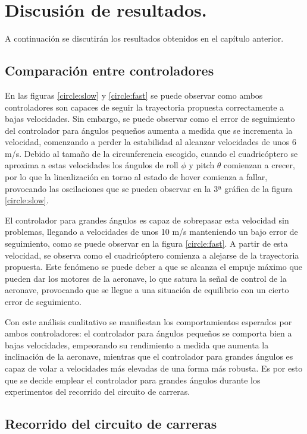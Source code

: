 \chapter{Discusión de resultados.}

A continuación se discutirán los resultados obtenidos en el capítulo anterior.

\section{Comparación entre controladores}

En las figuras \ref{circle:slow} y \ref{circle:fast} se puede observar como ambos controladores son capaces de seguir la trayectoria propuesta correctamente a bajas velocidades. Sin embargo, se puede observar como el error de seguimiento del controlador para ángulos pequeños aumenta a medida que se incrementa la velocidad, comenzando a perder la estabilidad al alcanzar velocidades de unos 6 m/s. Debido al tamaño de la circunferencia escogido, cuando el cuadricóptero se aproxima a estas velocidades los ángulos de roll $\phi $ y pitch $\theta$ comienzan a crecer, por lo que la linealización en torno al estado de hover comienza a fallar, provocando las oscilaciones que se pueden observar en la 3ª gráfica de la figura \ref{circle:slow}.

El controlador para grandes ángulos es capaz de sobrepasar esta velocidad sin problemas, llegando a velocidades de unos 10 m/s manteniendo un bajo error de seguimiento, como se puede observar en la figura \ref{circle:fast}. A partir de esta velocidad, se observa como el cuadricóptero comienza a alejarse de la trayectoria propuesta. Este fenómeno se puede deber a que se alcanza el empuje máximo que pueden dar los motores de la aeronave, lo que satura la señal de control de la aeronave, provocando que se llegue a una situación de equilibrio con un cierto error de seguimiento. 

Con este análisis cualitativo se manifiestan los comportamientos esperados por ambos controladores: el controlador para ángulos pequeños se comporta bien a bajas velocidades, empeorando su rendimiento a medida que aumenta la inclinación de la aeronave, mientras que el controlador para grandes ángulos es capaz de volar a velocidades más elevadas de una forma más robusta. Es por esto que se decide emplear el controlador para grandes ángulos durante los experimentos del recorrido del circuito de carreras.

\section{Recorrido del circuito de carreras}

